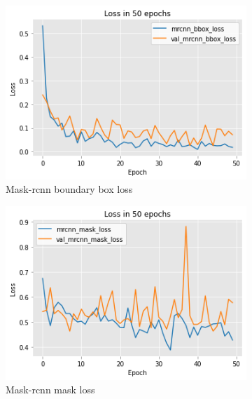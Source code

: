 \documentclass[../Head/Main.tex]{subfiles}
\begin{document}
\begin{figure}[H]
    \centering
    \begin{subfigure}[t]{.32\textwidth}
        \centering
        \includegraphics[width=\textwidth]{../Figures/rcnn_results/loss/plot_smalldata5.png}
        \caption{Mask-rcnn boundary box loss}
        \label{fig:mrcnn_bbox_loss_smalldata}
    \end{subfigure}
    \hfill
    \begin{subfigure}[t]{.32\textwidth}
        \centering
        \includegraphics[width=\textwidth]{../Figures/rcnn_results/loss/plot_smalldata6.png}
        \caption{Mask-rcnn mask loss}
        \label{fig:mrcnn_mask_loss_smalldata}
    \end{subfigure}
    \hfill
    \begin{subfigure}[t]{.32\textwidth}

\end{subfigure}
\end{figure}
\end{document}
